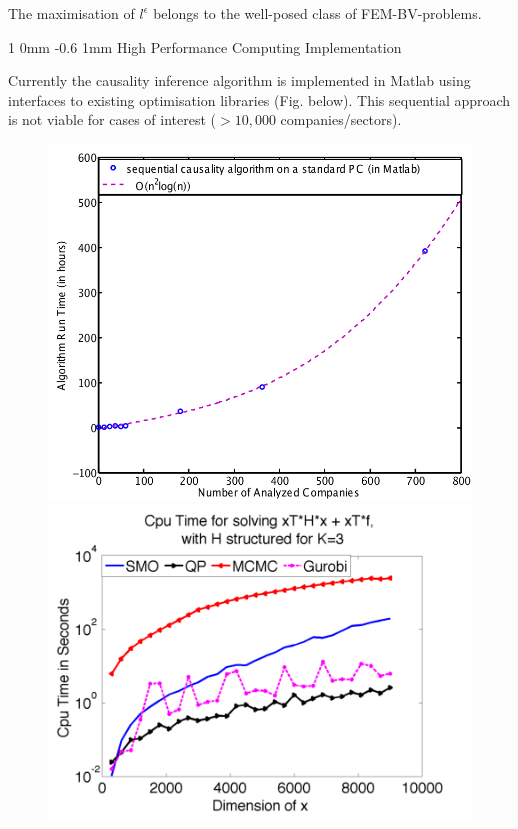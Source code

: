 \documentclass[a0,portrait]{a0poster}
\makeatletter
\renewcommand{\section}{\@startsection
        {section}%
        {1}%
        {0mm}%
        {-0.6\baselineskip}%
        {1mm}%
        {\Large\color{NTNUBlue}\bfseries}}%
\makeatother
\begin{document}
\begin{multicols}{2}
\noindent
{\large The maximisation of $l^\epsilon$ belongs to the well-posed class of FEM-BV-problems.}

\section{High Performance Computing Implementation}
\label{sec:hpc}

{\large Currently the causality inference algorithm is implemented in Matlab using interfaces to existing optimisation libraries (Fig. below).  This sequential approach is not viable for cases of interest ($> 10,000$ companies/sectors). }

\begin{figure}[H]
\begin{center} \centerline{
\includegraphics[width=15cm]{run_time_causality_inference.png}
\includegraphics[width=17cm]{Kaiser_structured_smo_mcmc_qp_gurobi_K3.png}
}
\end{center}
\end{figure}
\end{multicols}
\end{document}
